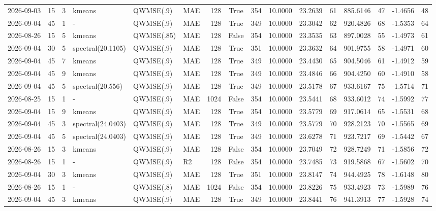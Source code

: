 \documentclass[10pt]{article}
\begin{document}
\begin{landscape}
\begin{longtable}{@{}lrrlllrcrrrrrrrr@{}}
2026-09-03 & 15 & 3 & kmeans & QWMSE(.9) & MAE & 128 & True & 354 & 10.0000 & 23.2639 & 61 & 885.6146 & 47 & -1.4656 & 48 \\
2026-09-04 & 45 & 1 & - & QWMSE(.9) & MAE & 128 & True & 349 & 10.0000 & 23.3042 & 62 & 920.4826 & 68 & -1.5353 & 64 \\
2026-08-26 & 15 & 5 & kmeans & QWMSE(.85) & MAE & 128 & False & 354 & 10.0000 & 23.3535 & 63 & 897.0028 & 55 & -1.4973 & 61 \\
2026-09-04 & 30 & 5 & spectral(20.1105) & QWMSE(.9) & MAE & 128 & True & 351 & 10.0000 & 23.3632 & 64 & 901.9755 & 58 & -1.4971 & 60 \\
2026-09-04 & 45 & 7 & kmeans & QWMSE(.9) & MAE & 128 & True & 349 & 10.0000 & 23.4430 & 65 & 904.5046 & 61 & -1.4912 & 59 \\
2026-09-04 & 45 & 9 & kmeans & QWMSE(.9) & MAE & 128 & True & 349 & 10.0000 & 23.4846 & 66 & 904.4250 & 60 & -1.4910 & 58 \\
2026-09-04 & 45 & 5 & spectral(20.556) & QWMSE(.9) & MAE & 128 & True & 349 & 10.0000 & 23.5178 & 67 & 933.6167 & 75 & -1.5714 & 71 \\
2026-08-25 & 15 & 1 & - & QWMSE(.9) & MAE & 1024 & False & 354 & 10.0000 & 23.5441 & 68 & 933.6012 & 74 & -1.5992 & 77 \\
2026-09-04 & 15 & 9 & kmeans & QWMSE(.9) & MAE & 128 & True & 354 & 10.0000 & 23.5779 & 69 & 917.0614 & 65 & -1.5531 & 68 \\
2026-09-04 & 45 & 3 & spectral(24.0403) & QWMSE(.9) & MAE & 128 & True & 349 & 10.0000 & 23.5779 & 70 & 928.2123 & 70 & -1.5565 & 69 \\
2026-09-04 & 45 & 5 & spectral(24.0403) & QWMSE(.9) & MAE & 128 & True & 349 & 10.0000 & 23.6278 & 71 & 923.7217 & 69 & -1.5442 & 67 \\
2026-08-26 & 15 & 3 & kmeans & QWMSE(.9) & MAE & 128 & False & 354 & 10.0000 & 23.7049 & 72 & 928.7249 & 71 & -1.5856 & 72 \\
2026-08-26 & 15 & 1 & - & QWMSE(.9) & R2 & 128 & False & 354 & 10.0000 & 23.7485 & 73 & 919.5868 & 67 & -1.5602 & 70 \\
2026-09-04 & 30 & 3 & kmeans & QWMSE(.9) & MAE & 128 & True & 351 & 10.0000 & 23.8147 & 74 & 944.4925 & 78 & -1.6148 & 80 \\
2026-08-26 & 15 & 1 & - & QWMSE(.8) & MAE & 1024 & False & 354 & 10.0000 & 23.8226 & 75 & 933.4923 & 73 & -1.5989 & 76 \\
2026-09-04 & 45 & 3 & kmeans & QWMSE(.9) & MAE & 128 & True & 349 & 10.0000 & 23.8441 & 76 & 941.3913 & 77 & -1.5928 & 74 \\

\end{longtable}
\end{landscape}
\end{document}
